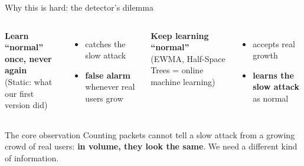 \documentclass[aspectratio=169,11pt]{beamer}
\newcommand{\key}[1]{\textcolor{gate}{\textbf{#1}}}
\begin{document}
\begin{frame}{Why this is hard: the detector's dilemma}
\begin{columns}[T]
\textbf{Learn ``normal'' once, never again}\\[1mm]
{\small (Static: what our first version did)}
\begin{itemize}
\item[\textcolor{good}{\checkmark}] catches the slow attack
\item[\textcolor{bad}{$\times$}] \key{false alarm} whenever real users grow
\end{itemize}
\textbf{Keep learning ``normal''}\\[1mm]
{\small (EWMA, Half-Space Trees = online machine learning)}
\begin{itemize}
\item[\textcolor{good}{\checkmark}] accepts real growth
\item[\textcolor{bad}{$\times$}] \key{learns the slow attack} as normal
\end{itemize}
\end{columns}
\vspace{6mm}
\begin{block}{The core observation}
Counting packets cannot tell a slow attack from a growing crowd of real users:
\textbf{in volume, they look the same}. We need a different kind of information.
\end{block}
\end{frame}
\end{document}

